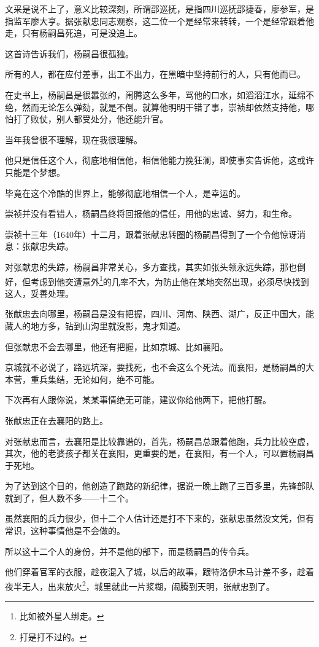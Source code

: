 \begin{multicols}{\theparacolNo}
		文采是说不上了，意义比较深刻，所谓邵巡抚，是指四川巡抚邵捷春，廖参军，是指监军廖大亨。据张献忠同志观察，这二位一个是经常来转转，一个是经常跟着他走，只有杨嗣昌死追，可是没追上。

		这首诗告诉我们，杨嗣昌很孤独。

		所有的人，都在应付差事，出工不出力，在黑暗中坚持前行的人，只有他而已。

		在史书上，杨嗣昌是很嚣张的，闹腾这么多年，骂他的口水，如滔滔江水，延绵不绝，然而无论怎么弹劾，就是不倒。就算他明明干错了事，崇祯却依然支持他，哪怕打了败仗，别人都受处分，他还能升官。

		当年我曾很不理解，现在我很理解。

		他只是信任这个人，彻底地相信他，相信他能力挽狂澜，即使事实告诉他，这或许只能是个梦想。

		毕竟在这个冷酷的世界上，能够彻底地相信一个人，是幸运的。

		崇祯并没有看错人，杨嗣昌终将回报他的信任，用他的忠诚、努力，和生命。

		崇祯十三年（1640年）十二月，跟着张献忠转圈的杨嗣昌得到了一个令他惊讶消息：张献忠失踪。

		对张献忠的失踪，杨嗣昌非常关心，多方查找，其实如张头领永远失踪，那也倒好，但考虑到他突遭意外\footnote{比如被外星人绑走。}的几率不大，为防止他在某地突然出现，必须尽快找到这人，妥善处理。

		张献忠去向哪里，杨嗣昌是没有把握，四川、河南、陕西、湖广，反正中国大，能藏人的地方多，钻到山沟里就没影，鬼才知道。

		但张献忠不会去哪里，他还有把握，比如京城、比如襄阳。

		京城就不必说了，路远坑深，要找死，也不会这么个死法。而襄阳，是杨嗣昌的大本营，重兵集结，无论如何，绝不可能。

		下次再有人跟你说，某某事情绝无可能，建议你给他两下，把他打醒。

		张献忠正在去襄阳的路上。

		对张献忠而言，去襄阳是比较靠谱的，首先，杨嗣昌总跟着他跑，兵力比较空虚，其次，他的老婆孩子都关在襄阳，更重要的是，在襄阳，有一个人，可以置杨嗣昌于死地。

		为了达到这个目的，他创造了跑路的新纪律，据说一晚上跑了三百多里，先锋部队就到了，但人数不多——十二个。

		虽然襄阳的兵力很少，但十二个人估计还是打不下来的，张献忠虽然没文凭，但有常识，这种事情他是不会做的。

		所以这十二个人的身份，并不是他的部下，而是杨嗣昌的传令兵。

		他们穿着官军的衣服，趁夜混入了城，以后的故事，跟特洛伊木马计差不多，趁着夜半无人，出来放火\footnote{打是打不过的。}，城里就此一片浆糊，闹腾到天明，张献忠到了。


\end{multicols}
